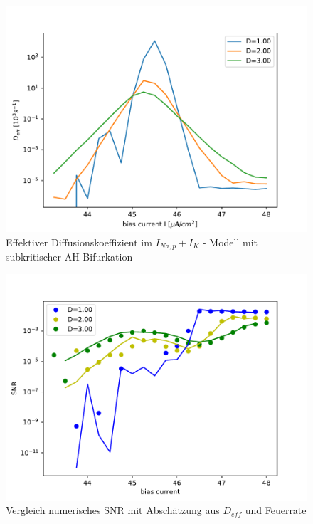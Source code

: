 \documentclass[12pt,a4paper]{article}
\begin{document}
\begin{figure}[H]
	\centering
	\includegraphics[scale=1]{dneurrealanhopf22j3.pdf}\caption{Effektiver Diffusionskoeffizient im $I_{Na,p}+I_K$ - Modell mit subkritischer AH-Bifurkation}
	\label{deffanhopf2}
\end{figure}
\begin{figure}[H]
	\centering
	\includegraphics[scale=1]{snrangerealanameasspallanhopf.pdf}\caption{Vergleich numerisches SNR mit Abschätzung aus $D_{eff}$ und Feuerrate}
	\label{snranhopflog}
\end{figure}
\end{document}
